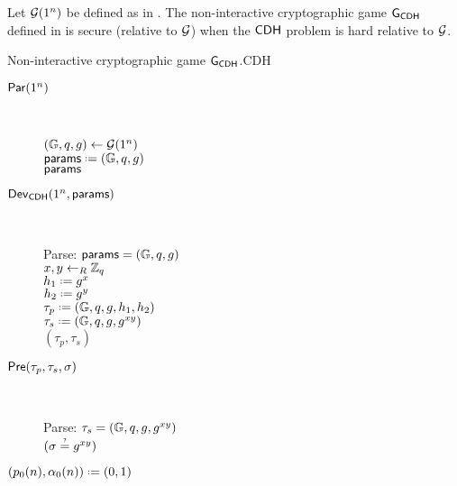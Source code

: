 \begin{comment}
\begin{thm}
\thmlab{CDHsecure}
Let $\groupgen$ be a polynomial-time algorithm that on input $1^n$, outputs a cyclic group $\cgroup$ of prime order $q$, $\vert q\vert = n$ and generator $g$. The non-interactive cryptographic game $\cgame_{\CDH}$ is secure (relative to $\groupgen$) when the $\CDH$ problem is hard relative to $\groupgen$. 
\end{thm}
\end{comment}

\begin{thm}
Let $\operatorname{\mathcal{G}}(1^n)$ be defined as in . The non-interactive cryptographic game $\operatorname{\mathsf{G}}_{\mathsf{CDH}}$ defined in  is secure (relative to $\operatorname{\mathcal{G}}$) when the $\mathsf{CDH}$ problem is hard relative to $\operatorname{\mathcal{G}}$. 
\end{thm}

\begin{boxfigGame}{Non-interactive cryptographic game $\operatorname{\mathsf{G}}_{\mathsf{CDH}}$.}{CDH}
  \begin{description}
 	 \item[\underline{$\operatorname{\mathsf{Par}}(1^n)$}] ~ 
  	
		$(\mathbb{G},q,g)\leftarrow\operatorname{\mathcal{G}}(1^n)$ \\
		$\params \defeq (\cgroup,\order,\generator)$ \\
		\Ret $\mathsf{params}$ 	
		
 	\item[\underline{$\operatorname{\mathsf{Dev}}_{\mathsf{CDH}}(1^n,\mathsf{params})$}] ~
 	
 		Parse: $\mathsf{params} = (\mathbb{G},q,g)$ \\
 		$x,y\leftarrow_R\mathbb{Z}_q$ \\
 		$h_1 \defeq g^{x}$ \\
 		$h_2 \defeq g^{y}$ \\
 		$\tau_p \defeq (\cgroup,\order,\generator,h_1,h_2)$ \\
 		$\tau_s \defeq (\cgroup,\order,\generator,g^{xy})$ \\
 		\Ret $(\tau_p,\tau_s)$

	\item[\underline{$\operatorname{\mathsf{Pre}}(\tau_p,\tau_s,\sigma)$}] ~
	
		Parse: $\tau_s = (\mathbb{G},q,g,g^{xy})$ \\
		\Ret $\askequal{\sigma}{g^{xy}}$
		
	\item[\underline{$\left(p_0(n), \secf(n)\right) \defeq (0,1)$}]
  \end{description}
\end{boxfigGame}

